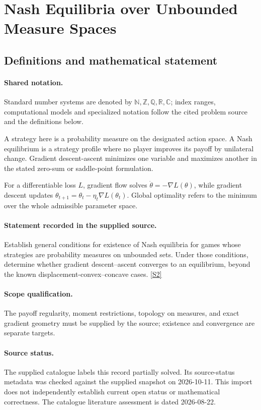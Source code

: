 \documentclass[11pt]{article}
\newcommand{\sref}[2]{\hyperlink{source:#1:#2}{[S#2]}}
\begin{document}
\section{Nash Equilibria over Unbounded Measure Spaces}\label{statement}

\subsection{Definitions and mathematical statement}

\paragraph{Shared notation.}Standard number systems are denoted by $\mathbb N,\mathbb Z,\mathbb Q,\mathbb R,\mathbb C$; index ranges, computational models and specialized notation follow the cited problem source and the definitions below.


A strategy here is a probability measure on the designated action space. A Nash equilibrium is a strategy profile where no player improves its payoff by unilateral change. Gradient descent-ascent minimizes one variable and maximizes another in the stated zero-sum or saddle-point formulation.

For a differentiable loss $L$, gradient flow solves $\dot\theta=-\nabla L(\theta)$, while gradient descent updates $\theta_{t+1}=\theta_t-\eta_t\nabla L(\theta_t)$. Global optimality refers to the minimum over the whole admissible parameter space.
\paragraph{Statement recorded in the supplied source.}
Establish general conditions for existence of Nash equilibria for games whose strategies are probability measures on unbounded sets. Under those conditions, determine whether gradient descent–ascent converges to an equilibrium, beyond the known displacement-convex–concave cases. \sref{statement}{2}
\paragraph{Scope qualification.}
The payoff regularity, moment restrictions, topology on measures, and exact gradient geometry must be supplied by the source; existence and convergence are separate targets.
\paragraph{Source status.}
The supplied catalogue labels this record partially solved. Its source-status metadata was checked against the supplied snapshot on 2026-10-11. This import does not independently establish current open status or mathematical correctness. The catalogue literature assessment is dated 2026-08-22.
\end{document}
